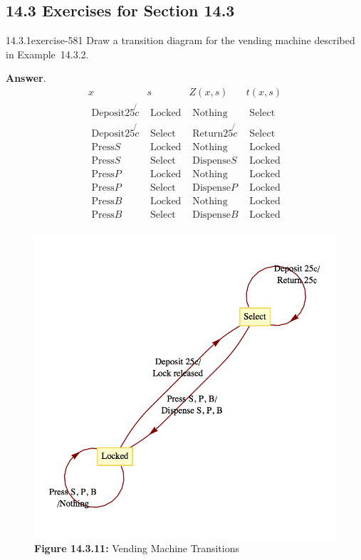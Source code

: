 \documentclass[twoside,10pt,]{book}
\numberwithin{equation}{section}
\begin{document}
\subsection*{14.3 Exercises for Section 14.3}
\begin{divisionsolution}{14.3.1}{}{exercise-581}%
\hypertarget{p-5227}{}%
Draw a transition diagram for the vending machine described in Example~14.3.2.%
\par\smallskip%
\noindent\textbf{Answer}.\quad%
\hypertarget{p-5228}{}%
%
\begin{equation*}
\begin{array}{cccc}
x & s & Z(x,s) & t(x,s) \\
\textrm{ Deposit} 25\not{c} & \textrm{ Locked} & \textrm{ Nothing} & \textrm{ Select} \\
\textrm{ Deposit} 25\not{c} & \textrm{ Select} & \textrm{ Return} 25\not{c} & \textrm{ Select} \\
\textrm{ Press} S & \textrm{ Locked} & \textrm{ Nothing} & \textrm{ Locked} \\
\textrm{ Press} S & \textrm{ Select} & \textrm{ Dispense} S & \textrm{ Locked} \\
\textrm{ Press} P & \textrm{ Locked} & \textrm{ Nothing} & \textrm{ Locked} \\
\textrm{ Press} P & \textrm{ Select} & \textrm{ Dispense} P & \textrm{ Locked} \\
\textrm{ Press} B & \textrm{ Locked} & \textrm{ Nothing} & \textrm{ Locked} \\
\textrm{ Press} B & \textrm{ Select} & \textrm{ Dispense} B & \textrm{ Locked} \\
\end{array}
\end{equation*}
%
\begin{figure}
\centering
\includegraphics[width=0.7\linewidth]{images/fig-vending-diagram.png}
\caption*{\textbf{Figure 14.3.11:} Vending Machine Transitions}
\end{figure}
\end{divisionsolution}%
\end{document}
